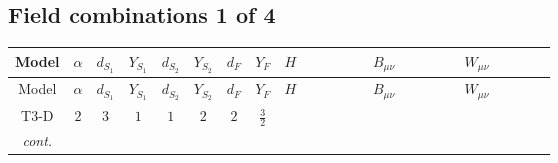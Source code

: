 \documentclass[8pt]{article}
\begin{document}
\begin{landscape}
\subsection*{Field combinations 1 of 4}
\begin{longtable}{@{}cccccccc >{\raggedright\arraybackslash}p{0.21\linewidth} >{\raggedright\arraybackslash}p{0.21\linewidth} >{\raggedright\arraybackslash}p{0.21\linewidth}@{}}
\toprule
Model & $\alpha$ & $d_{S_1}$ & $Y_{S_1}$ & $d_{S_2}$ & $Y_{S_2}$ & $d_F$ & $Y_F$ & $H$ & $B_{\mu\nu}$ & $W_{\mu\nu}$ \\
\midrule
\endfirsthead
\toprule
Model & $\alpha$ & $d_{S_1}$ & $Y_{S_1}$ & $d_{S_2}$ & $Y_{S_2}$ & $d_F$ & $Y_F$ & $H$ & $B_{\mu\nu}$ & $W_{\mu\nu}$ \\
\midrule
\endhead
T3-D & $2$ & $3$ & $1$ & $1$ & $2$ & $2$ & $\frac{3}{2}$ & \scriptsize\adjustbox{max width=\linewidth}{$\begin{gathered} +C_{\text{H2}} H_{a_1} H_{a_1}{}^{\dagger } \\ -H_{a_1} \mu ^2 H_{a_1}{}^{\dagger } \\ +\frac{2 \hbar  \overline{\lambda_5} H_{a_1} H_{a_2} \lambda_5 H_{a_1}{}^{\dagger } H_{a_2}{}^{\dagger }}{\sqrt{3} \epsilon }\end{gathered}$} & \scriptsize\adjustbox{max width=\linewidth}{$\begin{gathered} -\frac{61 \hbar  B_{\mu _1\mu _2}^2}{12 \epsilon } \\ -\frac{1}{4} \hbar  \log \left(\frac{\bar{\mu}^{2}}{m_1^2}\right) B_{\mu _1\mu _2}^2 \\ -\frac{1}{3} \hbar  \log \left(\frac{\bar{\mu}^{2}}{m_2^2}\right) B_{\mu _1\mu _2}^2\end{gathered}$} & \scriptsize\adjustbox{max width=\linewidth}{$\begin{gathered} -\frac{2 \hbar  \left(W_{\mu _1\mu _2}^{A_1}\right){}^2}{3 \epsilon } \\ -\frac{1}{6} \hbar  \log \left(\frac{\bar{\mu}^{2}}{m_1^2}\right) \left(W_{\mu _1\mu _2}^{A_1}\right){}^2\end{gathered}$} \\
\textit{cont.} &  &  &  &  &  &  &  & \scriptsize\adjustbox{max width=\linewidth}{$\begin{gathered} +\frac{2 \hbar  \overline{\lambda_5} H_{a_1} H_{a_2} m_1^2 \lambda_5 H_{a_1}{}^{\dagger } H_{a_2}{}^{\dagger }}{\sqrt{3} \left(m_1^2-m_2^2\right)} \\ +\frac{2 \hbar  \log \left(\frac{\bar{\mu}^{2}}{m_1^2}\right) \overline{\lambda_5} H_{a_1} H_{a_2} m_1^2 \lambda_5 H_{a_1}{}^{\dagger } H_{a_2}{}^{\dagger }}{\sqrt{3} \left(m_1^2-m_2^2\right)} \\ -\frac{2 \hbar  \overline{\lambda_5} H_{a_1} H_{a_2} m_2^2 \lambda_5 H_{a_1}{}^{\dagger } H_{a_2}{}^{\dagger }}{\sqrt{3} \left(m_1^2-m_2^2\right)}\end{gathered}$} &  &  \\

\end{longtable}
\end{landscape}
\end{document}
